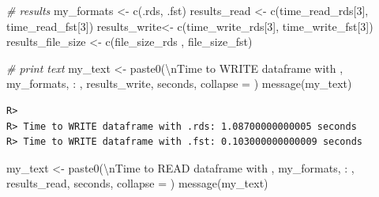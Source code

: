\documentclass[
  12pt,
]{book}
\newenvironment{Shaded}{\begin{snugshade}}{\end{snugshade}}
\newcommand{\AttributeTok}[1]{\textcolor[rgb]{0.61,0.61,0.61}{#1}}
\newcommand{\CommentTok}[1]{\textcolor[rgb]{0.37,0.37,0.37}{\textit{#1}}}
\newcommand{\DecValTok}[1]{\textcolor[rgb]{0.06,0.06,0.06}{#1}}
\newcommand{\FunctionTok}[1]{\textcolor[rgb]{0,0,0}{#1}}
\newcommand{\NormalTok}[1]{#1}
\newcommand{\OtherTok}[1]{\textcolor[rgb]{0.37,0.37,0.37}{#1}}
\newcommand{\SpecialCharTok}[1]{\textcolor[rgb]{0,0,0}{#1}}
\newcommand{\StringTok}[1]{\textcolor[rgb]{0.5,0.5,0.5}{#1}}
\begin{document}
\begin{Shaded}
\begin{Highlighting}[]
\CommentTok{\# results}
\NormalTok{my\_formats }\OtherTok{\textless{}{-}} \FunctionTok{c}\NormalTok{(}\StringTok{\textquotesingle{}.rds\textquotesingle{}}\NormalTok{, }\StringTok{\textquotesingle{}.fst\textquotesingle{}}\NormalTok{)}
\NormalTok{results\_read }\OtherTok{\textless{}{-}} \FunctionTok{c}\NormalTok{(time\_read\_rds[}\DecValTok{3}\NormalTok{], time\_read\_fst[}\DecValTok{3}\NormalTok{])}
\NormalTok{results\_write}\OtherTok{\textless{}{-}} \FunctionTok{c}\NormalTok{(time\_write\_rds[}\DecValTok{3}\NormalTok{], time\_write\_fst[}\DecValTok{3}\NormalTok{])}
\NormalTok{results\_file\_size }\OtherTok{\textless{}{-}} \FunctionTok{c}\NormalTok{(file\_size\_rds , file\_size\_fst)}

\CommentTok{\# print text}
\NormalTok{my\_text }\OtherTok{\textless{}{-}} \FunctionTok{paste0}\NormalTok{(}\StringTok{\textquotesingle{}}\SpecialCharTok{\textbackslash{}n}\StringTok{Time to WRITE dataframe with \textquotesingle{}}\NormalTok{,}
\NormalTok{                  my\_formats, }\StringTok{\textquotesingle{}: \textquotesingle{}}\NormalTok{,}
\NormalTok{                  results\_write, }\StringTok{\textquotesingle{} seconds\textquotesingle{}}\NormalTok{, }\AttributeTok{collapse =} \StringTok{\textquotesingle{}\textquotesingle{}}\NormalTok{)}
\FunctionTok{message}\NormalTok{(my\_text)}
\end{Highlighting}
\end{Shaded}

\begin{verbatim}
R> 
R> Time to WRITE dataframe with .rds: 1.08700000000005 seconds
R> Time to WRITE dataframe with .fst: 0.103000000000009 seconds
\end{verbatim}

\begin{Shaded}
\begin{Highlighting}[]
\NormalTok{my\_text }\OtherTok{\textless{}{-}} \FunctionTok{paste0}\NormalTok{(}\StringTok{\textquotesingle{}}\SpecialCharTok{\textbackslash{}n}\StringTok{Time to READ dataframe with \textquotesingle{}}\NormalTok{,}
\NormalTok{                  my\_formats, }\StringTok{\textquotesingle{}: \textquotesingle{}}\NormalTok{,}
\NormalTok{                  results\_read, }\StringTok{\textquotesingle{} seconds\textquotesingle{}}\NormalTok{, }\AttributeTok{collapse =} \StringTok{\textquotesingle{}\textquotesingle{}}\NormalTok{)}
\FunctionTok{message}\NormalTok{(my\_text)}
\end{Highlighting}
\end{Shaded}
\end{document}
